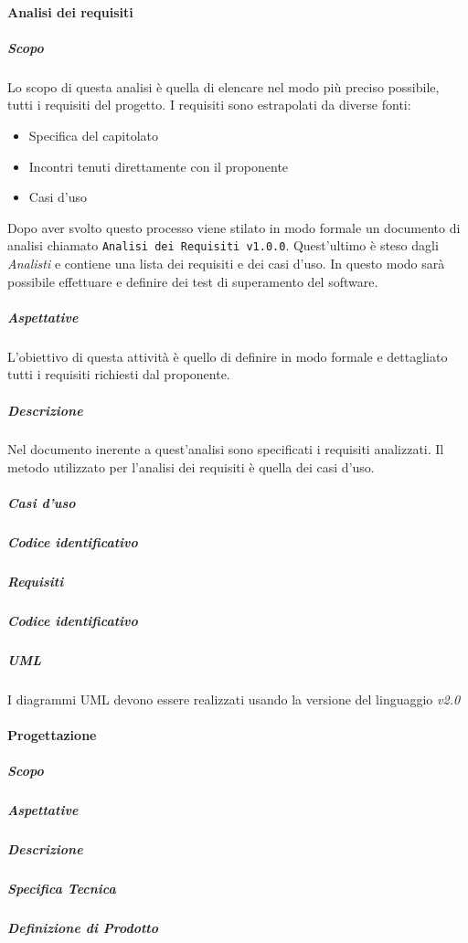 		\paragraph{Analisi dei requisiti}
			\subparagraph{Scopo}
			Lo scopo di questa analisi è quella di elencare nel modo più preciso possibile, tutti i requisiti del progetto. 
			I requisiti sono estrapolati da diverse fonti:
				\begin{itemize}
				\item Specifica del capitolato 
				\item Incontri tenuti direttamente con il proponente
				\item Casi d'uso
			\end{itemize}
		    Dopo aver svolto questo processo viene stilato in modo formale un documento di analisi chiamato \texttt{Analisi dei Requisiti v1.0.0}.
		    Quest'ultimo è steso dagli \emph{Analisti} e contiene una lista dei requisiti e dei casi d'uso.
		    In questo modo sarà possibile effettuare e definire dei test di superamento del software. 
			\subparagraph{Aspettative}
			L'obiettivo di questa attività è quello di definire in modo formale e dettagliato tutti i requisiti richiesti dal proponente.
			\subparagraph{Descrizione}
			Nel documento inerente a quest'analisi sono specificati i requisiti analizzati.
			Il metodo utilizzato per l'analisi dei requisiti è quella dei casi d'uso.
			\subparagraph{Casi d'uso}
			\subparagraph{Codice identificativo}
			\subparagraph{Requisiti}
			\subparagraph{Codice identificativo}
			\subparagraph{UML}
			I diagrammi UML devono essere realizzati usando la versione del linguaggio \textit{v2.0}
		\paragraph{Progettazione}
			\subparagraph{Scopo}
			\subparagraph{Aspettative}
			\subparagraph{Descrizione}
			\subparagraph{Specifica Tecnica}
			\subparagraph{Definizione di Prodotto}
